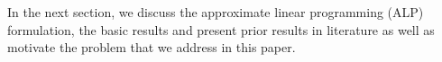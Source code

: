 \begin{comment}
\STATE Improve policy $u_{i+1}(s)=\arg\max_a (g_a(s)+\alpha\sum_{s'}p_a(s,s')\tilde{J}_{i}(s'))$.
\ENDFOR
\RETURN $u_n$
\end{algorithmic}
\label{appoliter}
\end{algorithm}
The performance guarantee of API can be stated as follows:
\begin{lemma}\label{pgapi}
If at each step $i$ one can guarantee that $||\tilde{J}_i-J_{u_i}||_\infty\leq \delta$, then one can show that $\lim_{n\ra\infty}||J_{u_i}-J^*||\leq \frac{2\delta\alpha}{(1-\alpha)^2}$.
\end{lemma}
Note that the error bound required by Lemma~\ref{pgapi} is in the $L_\infty$ norm, whereas \eqref{errbnd} is only in the $L_2$ norm. So API cannot guarantee an approximate policy improvement at each step which is a shortcoming. Also, even-though each evaluation step (line~\ref{appeval} of Algorithm~\ref{appoliter}) converges, the sequence ${u_n}, n\geq0$ is not guaranteed to converge. This is known as policy $\emph{chattering}$. Thus the problem of $\emph{control}$ is only partially addressed by API, i.e, suffers in both convergence and performance guarantees. \\
In short, whilst the approximate value function obtained by the solving the PBE offers guarantees for prediction it does not offer any guarantees for the control problem. \\
\end{comment}
In the next section, we discuss the approximate linear programming (ALP) formulation, the basic results and present prior results in literature as well as motivate the problem that we address in this paper. 

